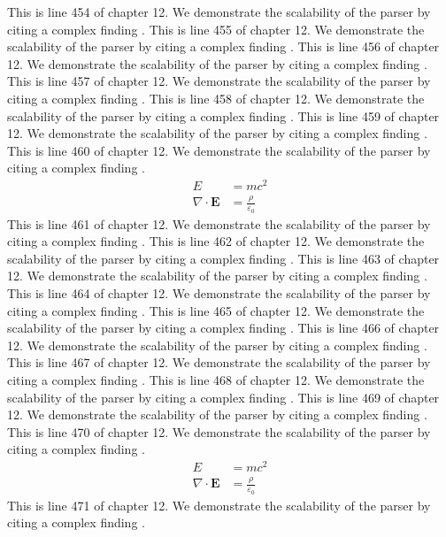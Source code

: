 This is line 454 of chapter 12. We demonstrate the scalability of the parser by citing a complex finding \cite{ref12_454}.
This is line 455 of chapter 12. We demonstrate the scalability of the parser by citing a complex finding \cite{ref12_455}.
This is line 456 of chapter 12. We demonstrate the scalability of the parser by citing a complex finding \cite{ref12_456}.
This is line 457 of chapter 12. We demonstrate the scalability of the parser by citing a complex finding \cite{ref12_457}.
This is line 458 of chapter 12. We demonstrate the scalability of the parser by citing a complex finding \cite{ref12_458}.
This is line 459 of chapter 12. We demonstrate the scalability of the parser by citing a complex finding \cite{ref12_459}.
This is line 460 of chapter 12. We demonstrate the scalability of the parser by citing a complex finding \cite{ref12_460}.
\begin{align*}
  E &= mc^2 \\
  \nabla \cdot \mathbf{E} &= \frac{\rho}{\varepsilon_0}
\end{align*}
This is line 461 of chapter 12. We demonstrate the scalability of the parser by citing a complex finding \cite{ref12_461}.
This is line 462 of chapter 12. We demonstrate the scalability of the parser by citing a complex finding \cite{ref12_462}.
This is line 463 of chapter 12. We demonstrate the scalability of the parser by citing a complex finding \cite{ref12_463}.
This is line 464 of chapter 12. We demonstrate the scalability of the parser by citing a complex finding \cite{ref12_464}.
This is line 465 of chapter 12. We demonstrate the scalability of the parser by citing a complex finding \cite{ref12_465}.
This is line 466 of chapter 12. We demonstrate the scalability of the parser by citing a complex finding \cite{ref12_466}.
This is line 467 of chapter 12. We demonstrate the scalability of the parser by citing a complex finding \cite{ref12_467}.
This is line 468 of chapter 12. We demonstrate the scalability of the parser by citing a complex finding \cite{ref12_468}.
This is line 469 of chapter 12. We demonstrate the scalability of the parser by citing a complex finding \cite{ref12_469}.
This is line 470 of chapter 12. We demonstrate the scalability of the parser by citing a complex finding \cite{ref12_470}.
\begin{align*}
  E &= mc^2 \\
  \nabla \cdot \mathbf{E} &= \frac{\rho}{\varepsilon_0}
\end{align*}
This is line 471 of chapter 12. We demonstrate the scalability of the parser by citing a complex finding \cite{ref12_471}.

